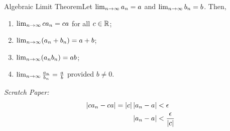 \begin{ntheorem}
    {Algebraic Limit Theorem}Let \(\lim_{n \rightarrow \infty} a_n = a\) and \(\lim_{n \rightarrow \infty} b_n = b\). Then,
    \begin{enumerate}[label=(\roman*)]
        \item \(\lim_{n \rightarrow \infty} ca_n = ca\) for all \(c \in \mathbb{R}\);
        \item \(\lim_{n \rightarrow \infty} (a_n + b_n) = a + b\);
        \item \(\lim_{n \rightarrow \infty} (a_nb_n) = ab\);
        \item \(\lim_{n \rightarrow \infty} \frac{a_n}{b_n} = \frac{a}{b}\) provided \(b \neq 0\).
    \end{enumerate}
\end{ntheorem}

\textit{Scratch Paper:}
\begin{align*}
    \left|ca_n - ca\right| = \left|c\right|\left|a_n - a\right| & < \epsilon                    \\
    \left|a_n - a\right|                                & < \frac{\epsilon}{\left|c\right|}
\end{align*}
